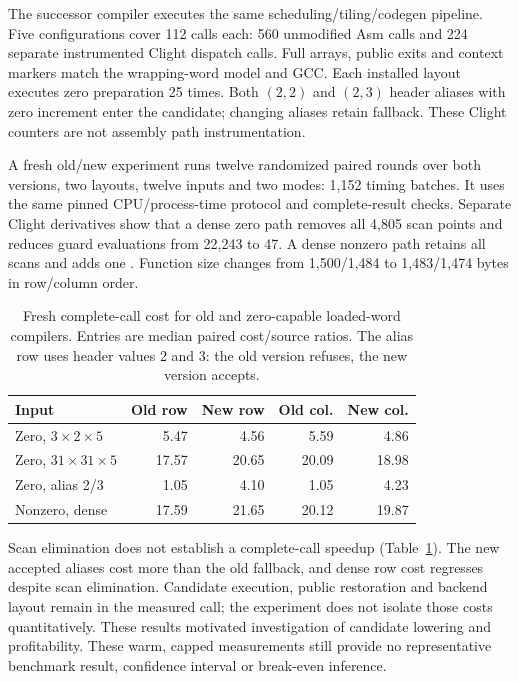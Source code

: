 The successor compiler executes the same scheduling/tiling/codegen pipeline.
Five configurations cover 112 calls each: 560 unmodified Asm calls and 224
separate instrumented Clight dispatch calls. Full arrays, public exits and
context markers match the wrapping-word model and GCC. Each installed layout
executes zero preparation 25 times. Both $(2,2)$ and $(2,3)$ header aliases with
zero increment enter the candidate; changing aliases retain fallback. These
Clight counters are not assembly path instrumentation.

A fresh old/new experiment runs twelve randomized paired rounds over both
versions, two layouts, twelve inputs and two modes: 1,152 timing batches. It
uses the same pinned CPU/process-time protocol and complete-result checks.
Separate Clight derivatives show that a dense zero path removes all 4,805
scan points and reduces guard  evaluations from 22,243 to 47. A dense
nonzero path retains all scans and adds one . Function size changes
from 1,500/1,484 to 1,483/1,474 bytes in row/column order.

\begin{table}[t]
\centering
\caption{Fresh complete-call cost for old and zero-capable loaded-word
compilers. Entries are median paired cost/source ratios. The alias row uses
header values 2 and 3: the old version refuses, the new version accepts.}
\label{tab:zero-loaded-word-cost}
\begin{tabular}{lrrrr}
\toprule
Input & Old row & New row & Old col. & New col. \\
\midrule
Zero, $3\times2\times5$ & 5.47 & 4.56 & 5.59 & 4.86 \\
Zero, $31\times31\times5$ & 17.57 & 20.65 & 20.09 & 18.98 \\
Zero, alias 2/3 & 1.05 & 4.10 & 1.05 & 4.23 \\
Nonzero, dense & 17.59 & 21.65 & 20.12 & 19.87 \\
\bottomrule
\end{tabular}
\end{table}

Scan elimination does not establish a complete-call speedup
(Table~\ref{tab:zero-loaded-word-cost}). The new accepted aliases cost more
than the old fallback, and dense row cost regresses despite scan elimination.
Candidate execution, public restoration and backend layout remain in the
measured call; the experiment does not isolate those costs quantitatively.
These results motivated investigation of candidate lowering and profitability.
These warm, capped measurements still provide no representative
benchmark result, confidence interval or break-even inference.

